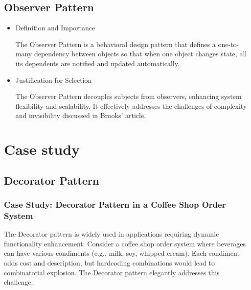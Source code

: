 \documentclass[11pt]{article}
\begin{document}
\subsection{Observer Pattern}
\begin{itemize}
\item Definition and Importance

The Observer Pattern is a behavioral design pattern that defines a one-to-many dependency between objects so that when one object changes state, all its dependents are notified and updated automatically.

\item Justification for Selection

The Observer Pattern decouples subjects from observers, enhancing system flexibility and scalability. It effectively addresses the challenges of complexity and invisibility discussed in Brooks’ article.
\end{itemize}

\section{Case study}

\subsection{Decorator Pattern}
\subsubsection{Case Study: Decorator Pattern in a Coffee Shop Order System}
The Decorator pattern is widely used in applications requiring dynamic functionality enhancement. Consider a coffee shop order system where beverages can have various condiments (e.g., milk, soy, whipped cream). Each condiment adds cost and description, but hardcoding combinations would lead to combinatorial explosion. The Decorator pattern elegantly addresses this challenge.  
\end{document}
